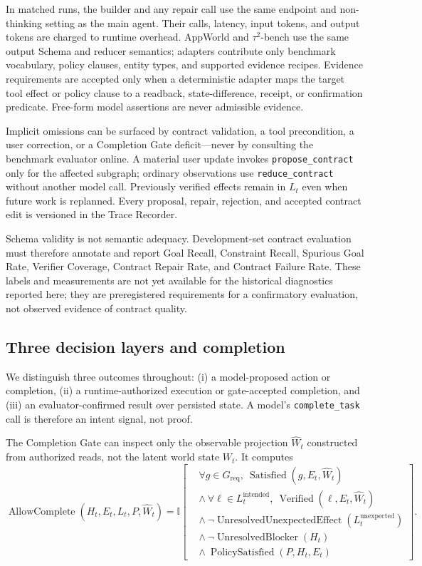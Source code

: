 \documentclass[10pt]{article}
\newcommand{\code}[1]{\texttt{#1}}
\begin{document}
In matched runs, the builder and any repair call use the same endpoint and
non-thinking setting as the main agent. Their calls, latency, input tokens, and
output tokens are charged to runtime overhead. AppWorld and $\tau^2$-bench use the
same output Schema and reducer semantics; adapters contribute only benchmark
vocabulary, policy clauses, entity types, and supported evidence recipes. Evidence
requirements are accepted only when a deterministic adapter maps the target tool
effect or policy clause to a readback, state-difference, receipt, or confirmation
predicate. Free-form model assertions are never admissible evidence.

Implicit omissions can be surfaced by contract validation, a tool precondition,
a user correction, or a Completion Gate deficit---never by consulting the benchmark
evaluator online. A material user update invokes \code{propose\_contract} only for
the affected subgraph; ordinary observations use \code{reduce\_contract} without
another model call. Previously verified effects remain in $L_t$ even when future
work is replanned. Every proposal, repair, rejection, and accepted contract edit is
versioned in the Trace Recorder.

Schema validity is not semantic adequacy. Development-set contract evaluation must
therefore annotate and report Goal Recall, Constraint Recall, Spurious Goal Rate,
Verifier Coverage, Contract Repair Rate, and Contract Failure Rate. These labels
and measurements are not yet available for the historical diagnostics reported
here; they are preregistered requirements for a confirmatory evaluation, not
observed evidence of contract quality.

\subsection{Three decision layers and completion}

We distinguish three outcomes throughout: (i) a model-proposed action or completion,
(ii) a runtime-authorized execution or gate-accepted completion, and (iii) an
evaluator-confirmed result over persisted state. A model's \code{complete\_task}
call is therefore an intent signal, not proof.

The Completion Gate can inspect only the observable projection $\widehat W_t$
constructed from authorized reads, not the latent world state $W_t$. It computes
\begin{equation}
\operatorname{AllowComplete}(H_t,E_t,L_t,P,\widehat W_t)=
\mathbb{I}\!\left[
\begin{aligned}
&\forall g\in G_{\mathrm{req}},\ \operatorname{Satisfied}(g,E_t,\widehat W_t)\\
&\land\ \forall \ell\in L_t^{\mathrm{intended}},\ \operatorname{Verified}(\ell,E_t,\widehat W_t)\\
&\land\ \neg\operatorname{UnresolvedUnexpectedEffect}(L_t^{\mathrm{unexpected}})\\
&\land\ \neg\operatorname{UnresolvedBlocker}(H_t)\\
&\land\ \operatorname{PolicySatisfied}(P,H_t,E_t)
\end{aligned}
\right].
\label{eq:completion}
\end{equation}
\end{document}

